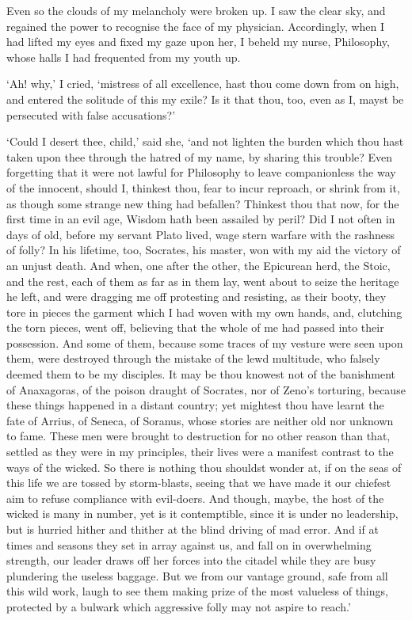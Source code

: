 \documentclass[12pt]{book}
\begin{document}
Even so the clouds of my melancholy were broken up. I saw the clear sky,
and regained the power to recognise the face of my physician.
Accordingly, when I had lifted my eyes and fixed my gaze upon her, I
beheld my nurse, Philosophy, whose halls I had frequented from my youth
up.

`Ah! why,' I cried, `mistress of all excellence, hast thou come down
from on high, and entered the solitude of this my exile? Is it that
thou, too, even as I, mayst be persecuted with false accusations?'

`Could I desert thee, child,' said she, `and not lighten the burden  
which thou hast taken upon thee through the hatred of my name, by       
sharing this trouble? Even forgetting that it were not lawful for       
Philosophy to leave companionless the way of the innocent, should I,    
thinkest thou, fear to incur reproach, or shrink from it, as though     
some strange new thing had befallen? Thinkest thou that now, for        
the first time in an evil age, Wisdom hath been assailed by peril?      
Did I not often in days of old, before my servant Plato lived, wage     
stern warfare with the rashness of folly? In his lifetime, too,         
Socrates, his master, won with my aid the victory of an unjust death.   
\label{otherPhilosophies}And when, one after the other, the Epicurean   
herd, the Stoic, and the rest, each of them as far as in them lay,      
went about to seize the heritage he left, and were dragging me off      
protesting and resisting, as their booty, they tore in pieces the       
garment which I had woven with my own hands, and, clutching the torn    
pieces, went off, believing that the whole of me had passed into        
their possession. And some of them, because some traces of my vesture   
were seen upon them, were destroyed through the mistake of the lewd     
multitude, who falsely deemed them to be my disciples. It may be thou   
knowest not of the banishment of Anaxagoras, of the poison draught of   
Socrates, nor of Zeno's torturing, because these things happened in a   
distant country; yet mightest thou have learnt the fate of Arrius, of   
Seneca, of Soranus, whose stories are neither old nor unknown to fame.  
These men were brought to destruction for no other reason than that,    
settled as they were in my principles, their lives were a manifest      
contrast to the ways of the wicked. So there is nothing thou shouldst   
wonder at, if on the seas of this life we are tossed by storm-blasts,   
seeing that we have made it our chiefest aim to refuse compliance       
with evil-doers. And though, maybe, the host of the wicked is many in   
number, yet is it contemptible, since it is under no leadership, but    
is hurried hither and thither at the blind driving of mad error. And    
if at times and seasons they set in array against us, and fall on in    
overwhelming strength, our leader draws off her forces into the citadel 
while they are busy plundering the useless baggage. But we from our     
vantage ground, safe from all this wild work, laugh to see them making  
prize of the most valueless of things, protected by a bulwark which     
aggressive folly may not aspire to reach.'                              
\end{document}
